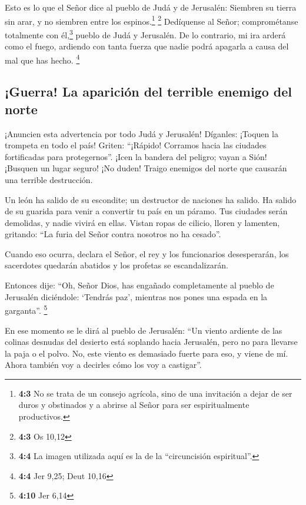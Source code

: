  Esto es lo que el Señor dice al pueblo de Judá y de
Jerusalén: Siembren su tierra sin arar, y no siembren entre los
espinos.\footnote{\textbf{4:3} No se trata de un consejo agrícola, sino
  de una invitación a dejar de ser duros y obstinados y a abrirse al
  Señor para ser espiritualmente productivos.} \footnote{\textbf{4:3} Os
  10,12}  Dedíquense al Señor; comprométanse totalmente
con él,\footnote{\textbf{4:4} La imagen utilizada aquí es la de la
  ``circuncisión espiritual''.} pueblo de Judá y Jerusalén. De lo
contrario, mi ira arderá como el fuego, ardiendo con tanta fuerza que
nadie podrá apagarla a causa del mal que has hecho. \footnote{\textbf{4:4}
  Jer 9,25; Deut 10,16}

\hypertarget{guerra-la-apariciuxf3n-del-terrible-enemigo-del-norte}{%
\subsection{¡Guerra! La aparición del terrible enemigo del
norte}\label{guerra-la-apariciuxf3n-del-terrible-enemigo-del-norte}}

 ¡Anuncien esta advertencia por todo Judá y Jerusalén!
Díganles: ¡Toquen la trompeta en todo el país! Griten: ``¡Rápido!
Corramos hacia las ciudades fortificadas para protegernos''.
 ¡Icen la bandera del peligro; vayan a Sión! ¡Busquen un
lugar seguro! ¡No duden! Traigo enemigos del norte que causarán una
terrible destrucción.

 Un león ha salido de su escondite; un destructor de
naciones ha salido. Ha salido de su guarida para venir a convertir tu
país en un páramo. Tus ciudades serán demolidas, y nadie vivirá en
ellas.  Vistan ropas de cilicio, lloren y lamenten,
gritando: ``La furia del Señor contra nosotros no ha cesado''.

 Cuando eso ocurra, declara el Señor, el rey y los
funcionarios desesperarán, los sacerdotes quedarán abatidos y los
profetas se escandalizarán.

 Entonces dije: ``Oh, Señor Dios, has engañado
completamente al pueblo de Jerusalén diciéndole: `Tendrás paz', mientras
nos pones una espada en la garganta''. \footnote{\textbf{4:10} Jer 6,14}

 En ese momento se le dirá al pueblo de Jerusalén: ``Un
viento ardiente de las colinas desnudas del desierto está soplando hacia
Jerusalén, pero no para llevarse la paja o el polvo.  No,
este viento es demasiado fuerte para eso, y viene de mí. Ahora también
voy a decirles cómo los voy a castigar''.

